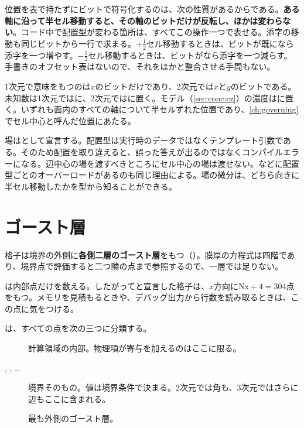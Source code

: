 位置を表で持たずにビットで符号化するのは、次の性質があるからである。\textbf{ある軸に沿って半セル移動すると、その軸のビットだけが反転し、ほかは変わらない}。コード中で配置型が変わる箇所は、すべてこの操作一つで表せる。添字の移動も同じビットから一行で求まる。$+\tfrac12$セル移動するときは、ビットが既になら添字を一つ増やす。$-\tfrac12$セル移動するときは、ビットがなら添字を一つ減らす。手書きのオフセット表はないので、それをほかと整合させる手間もない。

1次元で意味をもつのは$x$のビットだけであり、2次元では$x$と$y$のビットである。未知数は1次元ではに、2次元ではに置く。モデル（\cref{sec:conc:cz}）の濃度はに置く。いずれも面内のすべての軸について半セルずれた位置であり、\cref{ch:governing}でセル中心と呼んだ位置にあたる。

場はとして宣言する。配置型は実行時のデータではなくテンプレート引数である。そのため配置を取り違えると、誤った答えが出るのではなくコンパイルエラーになる。辺中心の場を渡すべきところにセル中心の場は渡せない。などに配置型ごとのオーバーロードがあるのも同じ理由による。場の微分は、どちら向きに半セル移動したかを型から知ることができる。

\section{ゴースト層}
\label{sec:disc:ghost}

格子は境界の外側に\textbf{各側二層のゴースト層}をもつ（）。膜厚の方程式は四階であり、境界点で評価すると二つ隣の点まで参照するので、一層では足りない。

は内部点だけを数える。したがってと宣言した格子は、$x$方向に$\mathrm{Nx} + 4 = 304$点をもつ。メモリを見積もるときや、デバッグ出力から行数を読み取るときは、この点に気をつける。

は、すべての点を次の三つに分類する。

\begin{description}
  \item[] 計算領域の内部。物理項が寄与を加えるのはここに限る。
  \item[, , \dots] 境界そのもの。値は境界条件で決まる。2次元では角も、3次元ではさらに辺もここに含まれる。
  \item[] 最も外側のゴースト層。
\end{description}

